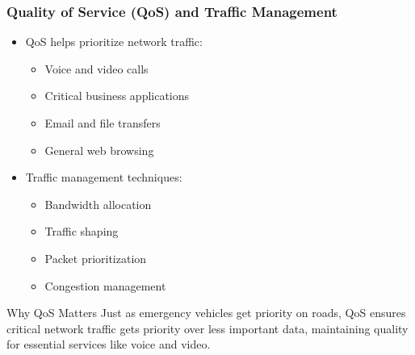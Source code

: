 \documentclass{beamer}
\begin{document}
\begin{frame}
    \frametitle{Quality of Service (QoS) and Traffic Management}
    
    \begin{itemize}
        \item QoS helps prioritize network traffic:
        \begin{itemize}
            \item Voice and video calls
            \item Critical business applications
            \item Email and file transfers
            \item General web browsing
        \end{itemize}
        
        \item Traffic management techniques:
        \begin{itemize}
            \item Bandwidth allocation
            \item Traffic shaping
            \item Packet prioritization
            \item Congestion management
        \end{itemize}
    \end{itemize}
    
    \begin{alertblock}{Why QoS Matters}
        Just as emergency vehicles get priority on roads, QoS ensures critical network traffic gets priority over less important data, maintaining quality for essential services like voice and video.
    \end{alertblock}
\end{frame}
\end{document}
